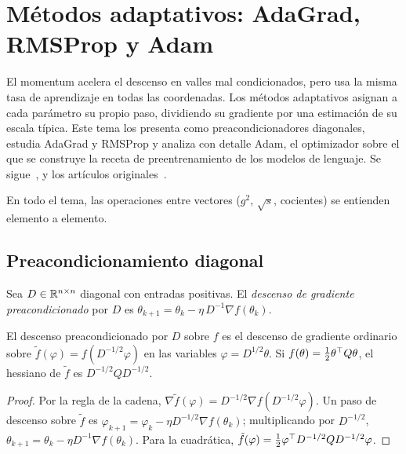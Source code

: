 \chapter{Métodos adaptativos: AdaGrad, RMSProp y Adam}
\label{tema:5}

El momentum acelera el descenso en valles mal condicionados, pero usa la misma tasa de aprendizaje en todas las coordenadas. Los métodos adaptativos asignan a cada parámetro su propio paso, dividiendo su gradiente por una estimación de su escala típica. Este tema los presenta como preacondicionadores diagonales, estudia AdaGrad y RMSProp y analiza con detalle Adam, el optimizador sobre el que se construye la receta de preentrenamiento de los modelos de lenguaje. Se sigue~\cite[§12.7, §12.8 y §12.10]{d2l}, \cite[§8.5]{gbc} y los artículos originales~\cite{adagrad,rmsprop,adam}.

En todo el tema, las operaciones entre vectores ($g^{2}$, $\sqrt{s}$, cocientes) se entienden elemento a elemento.

\section{Preacondicionamiento diagonal}

\begin{definicion}\label{def:precond}
Sea $D\in\mathbb{R}^{n\times n}$ diagonal con entradas positivas. El \emph{descenso de gradiente preacondicionado} por $D$ es $\theta_{k+1}=\theta_k-\eta\,D^{-1}\nabla f(\theta_k)$.
\end{definicion}

\begin{proposicion}\label{prop:precond}
El descenso preacondicionado por $D$ sobre $f$ es el descenso de gradiente ordinario sobre $\tilde f(\varphi)=f(D^{-1/2}\varphi)$ en las variables $\varphi=D^{1/2}\theta$. Si $f(\theta)=\frac12\theta^{\top} Q\theta$, el hessiano de $\tilde f$ es $D^{-1/2}QD^{-1/2}$.
\end{proposicion}

\begin{proof}
Por la regla de la cadena, $\nabla\tilde f(\varphi)=D^{-1/2}\nabla f(D^{-1/2}\varphi)$. Un paso de descenso sobre $\tilde f$ es $\varphi_{k+1}=\varphi_k-\eta D^{-1/2}\nabla f(\theta_k)$; multiplicando por $D^{-1/2}$, $\theta_{k+1}=\theta_k-\eta D^{-1}\nabla f(\theta_k)$. Para la cuadrática, $\tilde f(\varphi)=\frac12\varphi^{\top} D^{-1/2}QD^{-1/2}\varphi$.
\end{proof}

